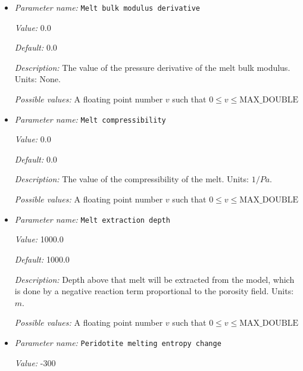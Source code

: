 \begin{itemize}
{\it Possible values:} A floating point number $v$ such that $-\text{MAX\_DOUBLE} \leq v \leq \text{MAX\_DOUBLE}$
\item {\it Parameter name:} {\tt Melt bulk modulus derivative}
\label{parameters:Material model/Melt simple/Melt bulk modulus derivative}


{\it Value:} 0.0


{\it Default:} 0.0


{\it Description:} The value of the pressure derivative of the melt bulk modulus. Units: None.


{\it Possible values:} A floating point number $v$ such that $0 \leq v \leq \text{MAX\_DOUBLE}$
\item {\it Parameter name:} {\tt Melt compressibility}
\label{parameters:Material model/Melt simple/Melt compressibility}


{\it Value:} 0.0


{\it Default:} 0.0


{\it Description:} The value of the compressibility of the melt. Units: $1/Pa$.


{\it Possible values:} A floating point number $v$ such that $0 \leq v \leq \text{MAX\_DOUBLE}$
\item {\it Parameter name:} {\tt Melt extraction depth}
\label{parameters:Material model/Melt simple/Melt extraction depth}


{\it Value:} 1000.0


{\it Default:} 1000.0


{\it Description:} Depth above that melt will be extracted from the model, which is done by a negative reaction term proportional to the porosity field. Units: $m$.


{\it Possible values:} A floating point number $v$ such that $0 \leq v \leq \text{MAX\_DOUBLE}$
\item {\it Parameter name:} {\tt Peridotite melting entropy change}
\label{parameters:Material model/Melt simple/Peridotite melting entropy change}


{\it Value:} -300



\end{itemize}
